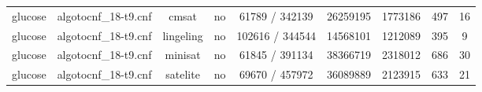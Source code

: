 \begin{appendices}
\begin{table}[p]
\begin{center}
\begin{tabular}{l|cccccccc}
  glucose                        & algotocnf\_18-t9.cnf           & cmsat      & no    & 61789 / 342139 & 26259195  & 1773186   & 497        & 16 \\ %
  glucose                        & algotocnf\_18-t9.cnf           & lingeling  & no    & 102616 / 344544 & 14568101  & 1212089   & 395        & 9 \\ %
  glucose                        & algotocnf\_18-t9.cnf           & minisat    & no    & 61845 / 391134 & 38366719  & 2318012   & 686        & 30 \\ %
  glucose                        & algotocnf\_18-t9.cnf           & satelite   & no    & 69670 / 457972 & 36089889  & 2123915   & 633        & 21 \\ %
    \end{tabular}
  \end{center}
\end{table}

\newpage


\end{appendices}
